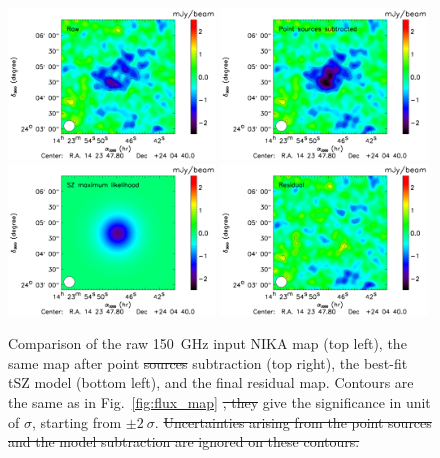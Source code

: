 \documentclass[twocolumn,traditabstract]{aa}
\providecommand{\DIFaddtex}[1]{{\protect\color{blue}\uwave{#1}}} %
\providecommand{\DIFdeltex}[1]{{\protect\color{red}\sout{#1}}}                      %
\providecommand{\DIFaddFL}[1]{\DIFadd{#1}} %
\providecommand{\DIFdelFL}[1]{\DIFdel{#1}} %
\providecommand{\DIFaddbeginFL}{} %
\providecommand{\DIFaddendFL}{} %
\providecommand{\DIFdelbeginFL}{} %
\providecommand{\DIFdelendFL}{} %
\providecommand{\DIFadd}[1]{\texorpdfstring{\DIFaddtex{#1}}{#1}} %
\providecommand{\DIFdel}[1]{\texorpdfstring{\DIFdeltex{#1}}{}} %
\begin{document}
\begin{figure}[h]
\centering
\includegraphics[width=0.49\textwidth]{Figure/MCMC_raw_map.pdf}
\includegraphics[width=0.49\textwidth]{Figure/MCMC_point_source_removed.pdf}
\includegraphics[width=0.49\textwidth]{Figure/MCMC_best_fit.pdf}
\includegraphics[width=0.49\textwidth]{Figure/MCMC_residual.pdf}
\caption{\DIFaddbeginFL \footnotesize \DIFaddendFL Comparison of the raw 150~GHz input NIKA map (top left), the same map after point \DIFdelbeginFL \DIFdelFL{sources }\DIFdelendFL \DIFaddbeginFL \DIFaddFL{source }\DIFaddendFL subtraction (top right), the best-fit tSZ model (bottom left), and the final residual map. Contours are the same as in Fig.~\ref{fig:flux_map} \DIFdelbeginFL \DIFdelFL{, they }\DIFdelendFL \DIFaddbeginFL \DIFaddFL{and }\DIFaddendFL give the significance in unit of $\sigma$, starting from $\pm 2 \ \sigma$. \DIFdelbeginFL \DIFdelFL{Uncertainties arising from the point sources and the model subtraction are ignored on these contours.}\DIFdelendFL }
\label{fig:MACSJ1424_MCMC_modeling}
\end{figure}
\end{document}
